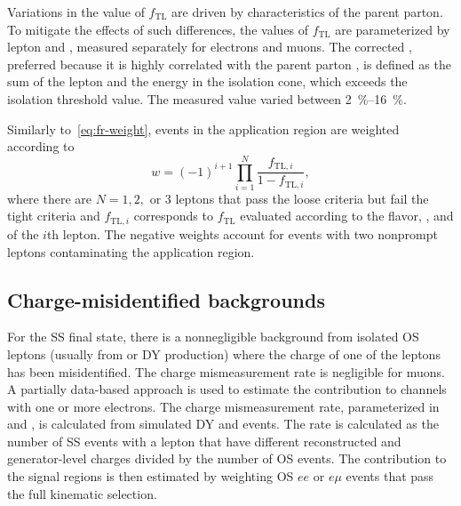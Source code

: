 Variations in the value of $f_\text{TL}$ are driven by characteristics of the parent parton. To
mitigate the effects of such differences, the values of $f_\text{TL}$ are parameterized by lepton
\pTcorr and \eta, measured separately for electrons and muons. The corrected \pTcorr, preferred
because it is highly correlated with the parent parton \pT, is defined as the sum of the lepton \pT
and the energy in the isolation cone, which exceeds the isolation threshold value. The measured
value varied between \SIrange{2}{16}{\percent}.

Similarly to~\cref{eq:fr-weight}, events in the application region are weighted according to
\begin{equation}
  w = (-1)^{i+1} \prod_{i=1}^N \frac{f_{\text{TL}, i}}{1-f_{\text{TL}, i}},
\end{equation}
where there are $N=1, 2, \text{ or } 3$ leptons that pass the loose criteria but fail the tight
criteria and $f_{\text{TL}, i}$ corresponds to $f_{\text{TL}}$ evaluated according to the flavor,
\pTcorr, and {\eta} of the $i$th lepton. The negative weights account for events with two nonprompt
leptons contaminating the application region.

\subsection{Charge-misidentified backgrounds}
For the SS \ttW final state, there is a nonnegligible background from isolated OS leptons (usually
from \ttbar or DY production) where the charge of one of the leptons has been misidentified. The
charge mismeasurement rate is negligible for muons. A partially data-based approach is used to
estimate the contribution to channels with one or more electrons. The charge mismeasurement rate,
parameterized in \pT and \eta, is calculated from simulated DY and \ttbar events. The rate is
calculated as the number of SS events with a lepton that have different reconstructed and
generator-level charges divided by the number of OS events. The contribution to the signal regions
is then estimated by weighting OS $ee$ or $e\mu$ events that pass the full kinematic selection.

